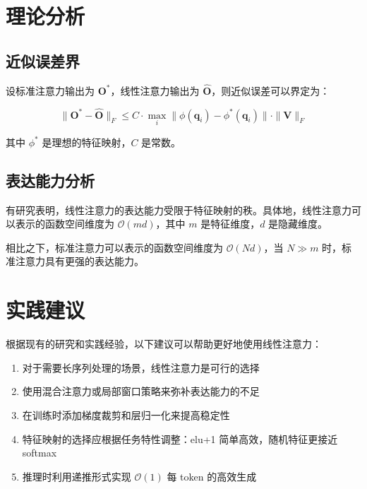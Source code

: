 \section{理论分析}

\subsection{近似误差界}

设标准注意力输出为 $\mathbf{O}^*$，线性注意力输出为 $\hat{\mathbf{O}}$，则近似误差可以界定为：

\begin{equation}
    \|\mathbf{O}^* - \hat{\mathbf{O}}\|_F \leq C \cdot \max_i \|\phi(\mathbf{q}_i) - \phi^*(\mathbf{q}_i)\| \cdot \|\mathbf{V}\|_F
\end{equation}

其中 $\phi^*$ 是理想的特征映射，$C$ 是常数。

\subsection{表达能力分析}

有研究表明，线性注意力的表达能力受限于特征映射的秩。具体地，线性注意力可以表示的函数空间维度为 $\mathcal{O}(md)$，其中 $m$ 是特征维度，$d$ 是隐藏维度。

相比之下，标准注意力可以表示的函数空间维度为 $\mathcal{O}(Nd)$，当 $N \gg m$ 时，标准注意力具有更强的表达能力。

\section{实践建议}

根据现有的研究和实践经验，以下建议可以帮助更好地使用线性注意力：

\begin{enumerate}
    \item 对于需要长序列处理的场景，线性注意力是可行的选择
    \item 使用混合注意力或局部窗口策略来弥补表达能力的不足
    \item 在训练时添加梯度裁剪和层归一化来提高稳定性
    \item 特征映射的选择应根据任务特性调整：elu+1 简单高效，随机特征更接近 softmax
    \item 推理时利用递推形式实现 $\mathcal{O}(1)$ 每 token 的高效生成
\end{enumerate}
